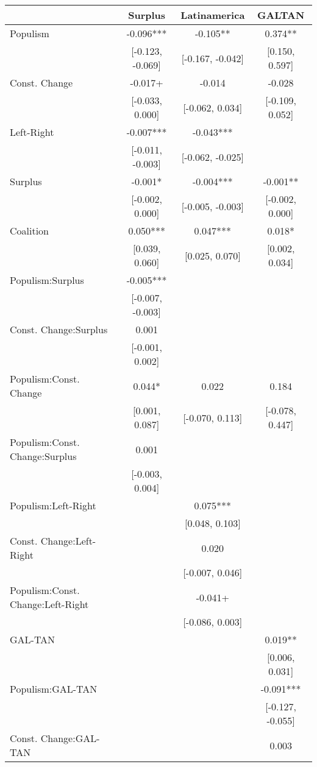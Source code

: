 \begin{table}
\centering\centering\centering
\begin{tabular}[t]{lccc}
\toprule
  & Surplus & Latinamerica & GALTAN\\
\midrule
Populism & -0.096*** & -0.105** & 0.374**\\
 & {}[-0.123, -0.069] & {}[-0.167, -0.042] & {}[0.150, 0.597]\\
Const. Change & -0.017+ & -0.014 & -0.028\\
 & {}[-0.033, 0.000] & {}[-0.062, 0.034] & {}[-0.109, 0.052]\\
Left-Right & -0.007*** & -0.043*** & \\
 & {}[-0.011, -0.003] & {}[-0.062, -0.025] & \\
Surplus & -0.001* & -0.004*** & -0.001**\\
 & {}[-0.002, 0.000] & {}[-0.005, -0.003] & {}[-0.002, 0.000]\\
Coalition & 0.050*** & 0.047*** & 0.018*\\
 & {}[0.039, 0.060] & {}[0.025, 0.070] & {}[0.002, 0.034]\\
Populism:Surplus & -0.005*** &  & \\
 & {}[-0.007, -0.003] &  & \\
Const. Change:Surplus & 0.001 &  & \\
 & {}[-0.001, 0.002] &  & \\
Populism:Const. Change & 0.044* & 0.022 & 0.184\\
 & {}[0.001, 0.087] & {}[-0.070, 0.113] & {}[-0.078, 0.447]\\
Populism:Const. Change:Surplus & 0.001 &  & \\
 & {}[-0.003, 0.004] &  & \\
Populism:Left-Right &  & 0.075*** & \\
 &  & {}[0.048, 0.103] & \\
Const. Change:Left-Right &  & 0.020 & \\
 &  & {}[-0.007, 0.046] & \\
Populism:Const. Change:Left-Right &  & -0.041+ & \\
 &  & {}[-0.086, 0.003] & \\
GAL-TAN &  &  & 0.019**\\
 &  &  & {}[0.006, 0.031]\\
Populism:GAL-TAN &  &  & -0.091***\\
 &  &  & {}[-0.127, -0.055]\\
Const. Change:GAL-TAN &  &  & 0.003\\

\end{tabular}
\end{table}
